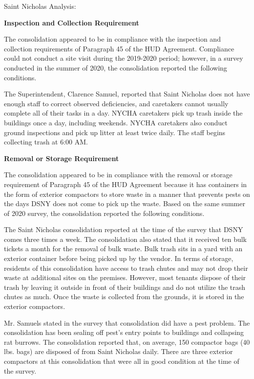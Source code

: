 Saint Nicholas Analysis: 

\textbf{Inspection and Collection Requirement} 

 

The consolidation appeared to be in compliance with the inspection and collection requirements of Paragraph 45 of the HUD Agreement. Compliance could not conduct a site visit during the 2019-2020 period; however, in a survey conducted in the summer of 2020, the consolidation reported the following conditions.

The Superintendent, Clarence Samuel, reported that Saint Nicholas does not have enough staff to correct observed deficiencies, and caretakers cannot usually complete all of their tasks in a day. NYCHA caretakers pick up trash inside the buildings once a day, including weekends. NYCHA caretakers also conduct ground inspections and pick up litter at least twice daily. The staff begins collecting trash at 6:00 AM.

\textbf{Removal or Storage Requirement} 

The consolidation appeared to be in compliance with the removal or storage requirement of Paragraph  45 of the HUD Agreement because it has containers in the form of exterior compactors to store waste in a manner that prevents pests on the days DSNY does not come to pick up the waste. Based on the same summer of  2020  survey, the consolidation reported the following conditions.

  

The Saint Nicholas consolidation reported at the time of the survey that DSNY comes three times a week. The consolidation also stated that it received ten bulk tickets a month for the removal of bulk waste. Bulk trash sits in a yard with an exterior container before being picked up by the vendor.  In terms of storage, residents of this consolidation have access to trash chutes and may not drop their waste at additional sites on the premises.  However, most tenants dispose of their trash by leaving it outside in front of their buildings and do not utilize the trash chutes as much. Once the waste is collected from the grounds, it is stored in the exterior compactors.  

 

Mr. Samuels stated in the survey that consolidation did have a pest problem. The consolidation has been sealing off pest's entry points to buildings and collapsing rat burrows. The consolidation reported that, on average, 150 compactor bags (40 lbs. bags)  are disposed of from Saint Nicholas daily. There are three exterior compactors at this consolidation that were all in good condition at the time of the survey.  

